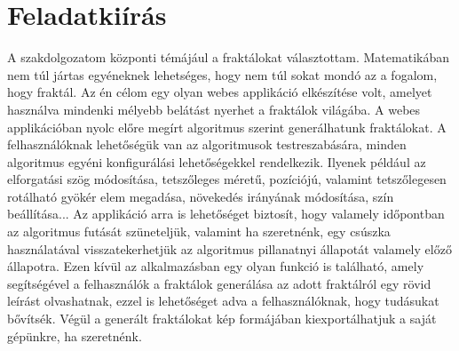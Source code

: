 \chapter*{Feladatkiírás}
A szakdolgozatom központi témájául a fraktálokat választottam. Matematikában nem túl jártas egyéneknek lehetséges, hogy nem túl sokat mondó az a fogalom, hogy fraktál. Az én célom egy olyan webes applikáció elkészítése volt, amelyet használva mindenki mélyebb belátást nyerhet a fraktálok világába. A webes applikációban nyolc előre megírt algoritmus szerint generálhatunk fraktálokat. A felhasználóknak lehetőségük van az algoritmusok testreszabására, minden algoritmus egyéni konfigurálási lehetőségekkel rendelkezik. Ilyenek például az elforgatási szög módosítása, tetszőleges méretű, pozíciójú, valamint tetszőlegesen rotálható gyökér elem megadása, növekedés irányának módosítása, szín beállítása... Az applikáció arra is lehetőséget biztosít, hogy valamely időpontban az algoritmus futását szüneteljük, valamint ha szeretnénk, egy csúszka használatával visszatekerhetjük az algoritmus pillanatnyi állapotát valamely előző állapotra. Ezen kívül az alkalmazásban egy olyan funkció is található, amely segítségével a felhasználók a fraktálok generálása az adott fraktálról egy rövid leírást olvashatnak, ezzel is lehetőséget adva a felhasználóknak, hogy tudásukat bővítsék. Végül a generált fraktálokat kép formájában kiexportálhatjuk a saját gépünkre, ha szeretnénk.

